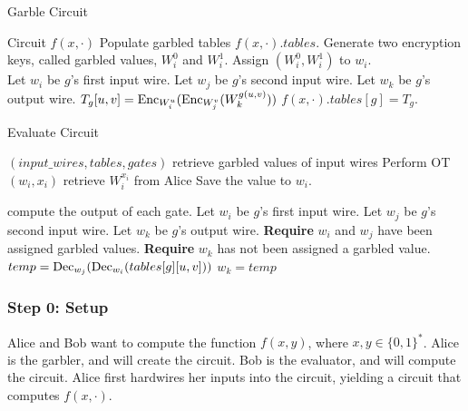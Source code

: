 \begin{algorithm}
\caption{Garble Circuit}
\label{alg:garble}
\begin{algorithmic}
    \Require Circuit $f(x,\cdot)$ 
    \Ensure Populate garbled tables $f(x,\cdot).tables$.
    \State Generate two encryption keys, called garbled values, $W_i^0$ and $W_i^1$.
    \State Assign $(W_i^0, W_i^1)$ to $w_i$.
\EndFor \\

    \State Let $w_i$ be $g$'s first input wire.
    \State Let $w_j$ be $g$'s second input wire.
    \State Let $w_k$ be $g$'s output wire.
    \State $T_g[u,v] = \operatorname{Enc}_{W_i^u}( \operatorname{Enc}_{W_j^v} ( W_k^{g(u,v)}))$
    \EndFor
    \State $f(x,\cdot).tables[g] = T_g$.
\EndFor
\end{algorithmic}
\end{algorithm}

\begin{algorithm}
\caption{Evaluate Circuit}
\label{alg:evaluate}
\begin{algorithmic}

\Require $(input\_wires, tables, gates)$
	\Comment retrieve garbled values of input wires
	\State Perform OT$(w_i, x_i)$ 
	\Comment retrieve $W^{x_i}_i$ from Alice
	\State Save the value to $w_i$.
\EndFor

	\Comment compute the output of each gate.
	\State Let $w_i$ be $g$'s first input wire.
	\State Let $w_j$ be $g$'s second input wire.
	\State Let $w_k$ be $g$'s output wire.
	\State \textbf{Require} $w_i$ and $w_j$ have been assigned garbled values.
	\State \textbf{Require} $w_k$ has not been assigned a garbled value.
		\State $temp = \operatorname{Dec}_{w_j}(\operatorname{Dec}_{w_i}(tables[g][u,v]))$
			\State $w_k = temp$
		\EndIf
	\EndFor
\EndFor
\end{algorithmic}
\end{algorithm}

\subsubsection{Step 0: Setup}
Alice and Bob want to compute the function $f(x,y)$, where $x,y \in \{0,1\}^*$.
Alice is the garbler, and will create the circuit.
Bob is the evaluator, and will compute the circuit.
Alice first hardwires her inputs into the circuit, yielding a circuit that computes $f(x,\cdot)$.

